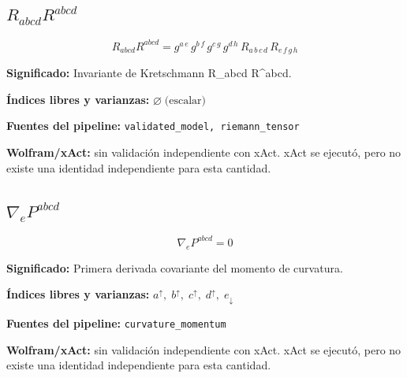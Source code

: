 \documentclass[11pt]{article}
\begin{document}
\subsection*{$ R_{abcd}R^{abcd} $}
\begin{dmath*}[breakdepth={5}]
R_{abcd}R^{abcd} = g{}^{a\,e}\,g{}^{b\,f}\,g{}^{c\,g}\,g{}^{d\,h}\,R{}_{a\,b\,c\,d}\,R{}_{e\,f\,g\,h}
\end{dmath*}
\par\vspace{1.2\baselineskip}\noindent
\begin{minipage}{\linewidth}
\textbf{Significado:} Invariante de Kretschmann R\_abcd R^abcd.\par
\textbf{Índices libres y varianzas:} $ \varnothing\;\text{(escalar)} $\par
\textbf{Fuentes del pipeline:} \texttt{validated\_model, riemann\_tensor}\par
\textbf{Wolfram/xAct:} sin validación independiente con xAct. xAct se ejecutó, pero no existe una identidad independiente para esta cantidad.\par
\end{minipage}
\subsection*{$ \nabla_e P^{abcd} $}
\begin{dmath*}[breakdepth={5}]
\nabla_e P^{abcd} = 0
\end{dmath*}
\par\vspace{1.2\baselineskip}\noindent
\begin{minipage}{\linewidth}
\textbf{Significado:} Primera derivada covariante del momento de curvatura.\par
\textbf{Índices libres y varianzas:} $ a^{\uparrow},\;b^{\uparrow},\;c^{\uparrow},\;d^{\uparrow},\;e_{\downarrow} $\par
\textbf{Fuentes del pipeline:} \texttt{curvature\_momentum}\par
\textbf{Wolfram/xAct:} sin validación independiente con xAct. xAct se ejecutó, pero no existe una identidad independiente para esta cantidad.\par
\end{minipage}
\end{document}
